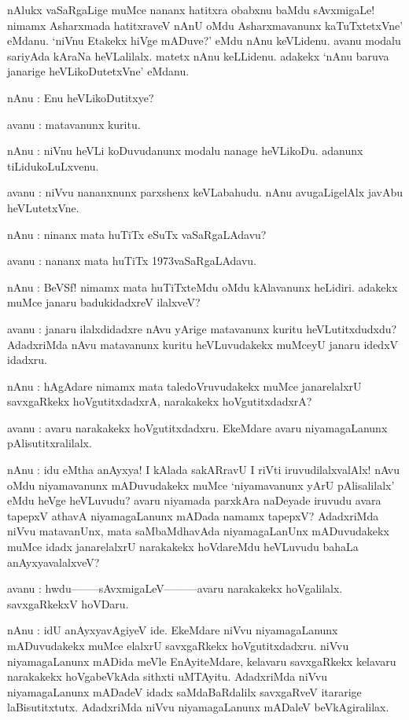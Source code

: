 nAlukx vaSaRgaLige muMce nananx hatitxra obabxnu baMdu sAvxmigaLe! nimamx Asharxmada hatitxraveV nAnU oMdu Asharxmavanunx kaTuTxtetxVne' eMdanu. `niVnu Etakekx hiVge mADuve?' eMdu nAnu keVLidenu. avanu modalu sariyAda kAraNa heVLalilalx. matetx nAnu keLLidenu. adakekx `nAnu baruva janarige heVLikoDutetxVne' eMdanu.

nAnu : Enu heVLikoDutitxye?

avanu : matavanunx kuritu.

nAnu : niVnu heVLi koDuvudanunx modalu nanage heVLikoDu. adanunx 
tiLidukoLuLxvenu.

avanu : niVvu nananxnunx parxshenx keVLabahudu. nAnu avugaLigelAlx 
javAbu heVLutetxVne.

nAnu : ninanx mata huTiTx eSuTx vaSaRgaLAdavu?

avanu : nananx mata huTiTx {\rm 1973}vaSaRgaLAdavu.

nAnu : BeVSf! nimamx mata huTiTxteMdu oMdu kAlavanunx heLidiri. adakekx muMce janaru badukidadxreV ilalxveV?

avanu : janaru ilalxdidadxre nAvu yArige matavanunx kuritu heVLutitxdudxdu? AdadxriMda nAvu matavanunx kuritu heVLuvudakekx muMceyU janaru idedxV idadxru.

nAnu : hAgAdare nimamx mata taledoVruvudakekx muMce janarelalxrU savxgaRkekx hoVgutitxdadxrA, narakakekx hoVgutitxdadxrA?

avanu : avaru narakakekx hoVgutitxdadxru. EkeMdare avaru niyamagaLanunx pAlisutitxralilalx.

nAnu : idu eMtha anAyxya! I kAlada sakARravU I riVti iruvudilalxvalAlx! nAvu oMdu niyamavanunx mADuvudakekx muMce `niyamavanunx yArU pAlisalilalx' eMdu heVge heVLuvudu? avaru niyamada parxkAra naDeyade iruvudu avara tapepxV athavA niyamagaLanunx mADada namamx tapepxV? AdadxriMda niVvu matavanUnx, mata saMbaMdhavAda niyamagaLanUnx mADuvudakekx muMce idadx janarelalxrU narakakekx hoVdareMdu heVLuvudu bahaLa anAyxyavalalxveV?

avanu : hwdu--------sAvxmigaLeV---------avaru narakakekx hoVgalilalx. savxgaRkekxV hoVDaru.

nAnu : idU anAyxyavAgiyeV ide. EkeMdare niVvu niyamagaLanunx mADuvudakekx muMce elalxrU savxgaRkekx hoVgutitxdadxru. niVvu niyamagaLanunx mADida meVle EnAyiteMdare, kelavaru savxgaRkekx kelavaru narakakekx hoVgabeVkAda sithxti uMTAyitu. AdadxriMda niVvu niyamagaLanunx mADadeV idadx saMdaBaRdalilx savxgaRveV itararige laBisutitxtutx. AdadxriMda niVvu niyamagaLanunx mADaleV beVkAgiralilax.

